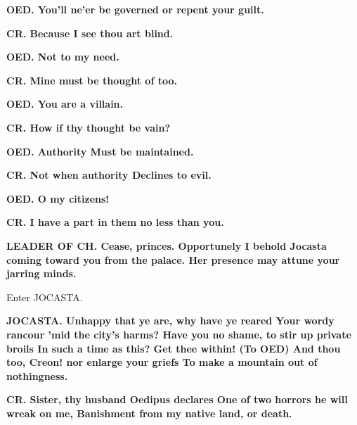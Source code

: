 \documentclass[11pt,letter]{book}
\begin{document}
\par \textbf{OED. You’ll ne’er be governed or repent your guilt.}
\par 

\par \textbf{CR. Because I see thou art blind.}
\par 

\par \textbf{OED. Not to my need.}
\par 

\par \textbf{CR. Mine must be thought of too.}
\par 

\par \textbf{OED. You are a villain.}
\par 

\par \textbf{CR. How if thy thought be vain?}
\par 

\par \textbf{OED. Authority Must be maintained.}
\par 

\par \textbf{CR. Not when authority Declines to evil.}
\par 

\par \textbf{OED. O my citizens!}
\par 

\par \textbf{CR. I have a part in them no less than you.}
\par 

\par \textbf{LEADER OF CH. Cease, princes. Opportunely I behold Jocasta coming toward you from the palace. Her presence may attune your jarring minds.}
\par 

\par  Enter JOCASTA.

\par \textbf{JOCASTA. Unhappy that ye are, why have ye reared Your wordy rancour ’mid the city’s harms? Have you no shame, to stir up private broils In such a time as this? Get thee within! (To OED) And thou too, Creon! nor enlarge your griefs To make a mountain out of nothingness.}
\par 

\par \textbf{CR. Sister, thy husband Oedipus declares One of two horrors he will wreak on me, Banishment from my native land, or death.}
\par 
\end{document}
